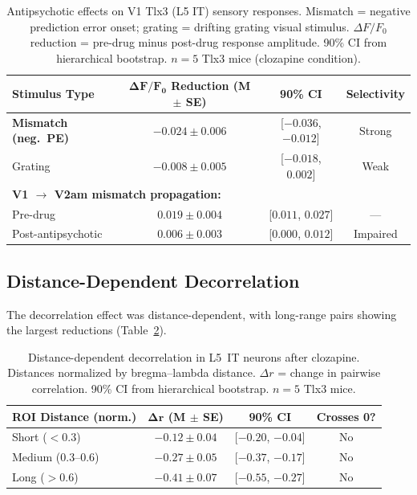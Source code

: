 \documentclass[11pt]{article}
\begin{document}
\begin{table}[H]
\centering
\caption{Antipsychotic effects on V1 Tlx3 (L5 IT) sensory responses. Mismatch = negative prediction error onset; grating = drifting grating visual stimulus. $\Delta F/F_0$ reduction = pre-drug minus post-drug response amplitude. 90\% CI from hierarchical bootstrap. $n = 5$ Tlx3 mice (clozapine condition).}
\label{tab:pe_responses}
\begin{tabular}{lccc}
\toprule
\textbf{Stimulus Type} & $\boldsymbol{\Delta F/F_0}$ \textbf{Reduction (M $\pm$ SE)} & \textbf{90\% CI} & \textbf{Selectivity} \\
\midrule
\textbf{Mismatch (neg.\ PE)} & $\mathbf{-0.024 \pm 0.006}$ & [$-0.036$, $-0.012$] & Strong \\
Grating & $-0.008 \pm 0.005$ & [$-0.018$, $0.002$] & Weak \\
\midrule
\multicolumn{4}{l}{\textbf{V1 $\to$ V2am mismatch propagation:}} \\
Pre-drug & $0.019 \pm 0.004$ & [$0.011$, $0.027$] & --- \\
Post-antipsychotic & $0.006 \pm 0.003$ & [$0.000$, $0.012$] & Impaired \\
\bottomrule
\end{tabular}
\end{table}

\subsection{Distance-Dependent Decorrelation}

The decorrelation effect was distance-dependent, with long-range pairs showing the largest reductions (Table~\ref{tab:distance}).

\begin{table}[H]
\centering
\caption{Distance-dependent decorrelation in L5~IT neurons after clozapine. Distances normalized by bregma--lambda distance. $\Delta r$ = change in pairwise correlation. 90\% CI from hierarchical bootstrap. $n = 5$ Tlx3 mice.}
\label{tab:distance}
\begin{tabular}{lccc}
\toprule
\textbf{ROI Distance (norm.)} & $\boldsymbol{\Delta r}$ \textbf{(M $\pm$ SE)} & \textbf{90\% CI} & \textbf{Crosses 0?} \\
\midrule
Short ($< 0.3$) & $-0.12 \pm 0.04$ & [$-0.20$, $-0.04$] & No \\
Medium (0.3--0.6) & $-0.27 \pm 0.05$ & [$-0.37$, $-0.17$] & No \\
Long ($> 0.6$) & $\mathbf{-0.41 \pm 0.07}$ & [$-0.55$, $-0.27$] & No \\
\bottomrule
\end{tabular}
\end{table}
\end{document}
